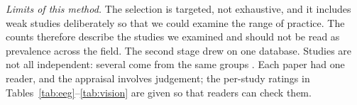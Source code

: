 \textit{Limits of this method.} The selection is targeted, not exhaustive, and it includes weak studies deliberately so that we could examine the range of practice. The counts therefore describe the studies we examined and should not be read as prevalence across the field. The second stage drew on one database. Studies are not all independent: several come from the same groups \cite{cui2021subject,cui2022eeg,cui2022compact,gao2024sftnet,gao2025comprehensive,xu2026dynamic,hu2026human,yan2026toward}. Each paper had one reader, and the appraisal involves judgement; the per-study ratings in Tables~\ref{tab:eeg}--\ref{tab:vision} are given so that readers can check them.
